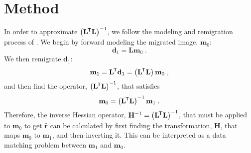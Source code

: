 \section{Method}
    In order to approximate $\left ( \mathbf{L}^{\mkern-1.5mu\mathsf{T}}\mathbf{L}\right) ^{-1}$, we follow the modeling and remigration process of \cite{imop}. 
    We begin by forward modeling the migrated image, $\mathbf{m}_0$:
    \begin{equation}
        \mathbf{d}_1 = \mathbf{L}\mathbf{m}_0 \;.
    \end{equation}
    We then remigrate $\mathbf{d}_1$:
    \begin{equation}
        \mathbf{m}_1 = \mathbf{L}^{\mkern-1.5mu\mathsf{T}}\mathbf{d}_1 = \left ( \mathbf{L}^{\mkern-1.5mu\mathsf{T}}\mathbf{L}\right ) \mathbf{m}_0 \; ,
    \end{equation}
    and then find the operator, $\left ( \mathbf{L} ^{\mkern-1.5mu\mathsf{T}} \mathbf{L} \right )^{-1}$, that satisfies
    \begin{equation}
        \mathbf{m}_0 = \left ( \mathbf{L}^{\mkern-1.5mu\mathsf{T}}\mathbf{L} \right ) ^{-1} \mathbf{m}_1 \;.
    \end{equation}
    Therefore, the inverse Hessian operator, $\mathbf{H}^{-1} = \left ( \mathbf{L} ^{\mkern-1.5mu\mathsf{T}} \mathbf{L} \right )^{-1}$, that must be applied to $\mathbf{m}_0$ to get $\hat{\mathbf{r}}$ can be calculated by first finding the transformation, $\mathbf{H}$, that maps $\mathbf{m}_0$ to $\mathbf{m}_1$, and then inverting it.
    This can be interpreted as a data matching problem between $\mathbf{m}_1$ and $\mathbf{m}_0$.

\begin{center}
\end{center}


